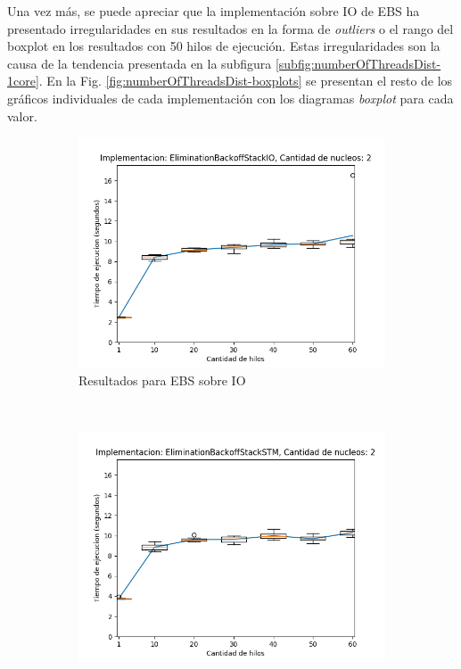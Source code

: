Una vez más, se puede apreciar que la implementación sobre IO de EBS ha presentado irregularidades en sus resultados en la forma de \emph{outliers} o el rango del boxplot en los resultados con 50 hilos de ejecución.
Estas irregularidades son la causa de la tendencia presentada en la subfigura \ref{subfig:numberOfThreadsDist-1core}.
En la Fig. \ref{fig:numberOfThreadsDist-boxplots} se presentan el resto de los gráficos individuales de cada implementación con los diagramas \emph{boxplot} para cada valor.

\clearpage
\begin{figure}[!h]
       \centering
    \begin{subfigure}[b]{0.49\textwidth}
        \includegraphics[width=\textwidth]{images/numberOfThreadsDist/plots/expEBSIO-2}
        \caption{Resultados para EBS sobre IO}
        \label{subfig:numberOfThreadsDist-ebsio-2}
    \end{subfigure}
    ~
    \begin{subfigure}[b]{0.49\textwidth}
        \includegraphics[width=\textwidth]{images/numberOfThreadsDist/plots/expEBSSTM-2}

\end{subfigure}
\end{figure}
